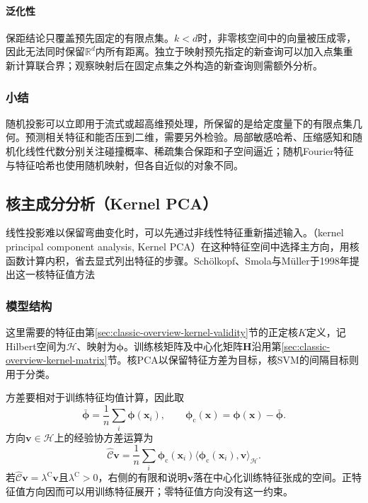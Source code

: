 \paragraph{泛化性}

保距结论只覆盖预先固定的有限点集。$k<d$时，非零核空间中的向量被压成零，因此无法同时保留$\mathbb{R}^{d}$内所有距离。独立于映射预先指定的新查询可以加入点集重新计算联合界；观察映射后在固定点集之外构造的新查询则需额外分析。

\subsubsection{小结}
\label{sec:dim-rp-summary}

随机投影可以立即用于流式或超高维预处理，所保留的是给定度量下的有限点集几何。预测相关特征和能否压到二维，需要另外检验。局部敏感哈希、压缩感知和随机化线性代数分别关注碰撞概率、稀疏集合保距和子空间逼近；随机Fourier特征与特征哈希也使用随机映射，但各自近似的对象不同。

\subsection{核主成分分析（Kernel PCA）}
\label{sec:dim-kpca}

线性投影难以保留弯曲变化时，可以先通过非线性特征重新描述输入。（kernel principal component analysis, Kernel PCA）在这种特征空间中选择主方向，用核函数计算内积，省去显式列出特征的步骤。Schölkopf、Smola与Müller于1998年提出这一核特征值方法

\subsubsection{模型结构}

这里需要的特征由第\ref{sec:classic-overview-kernel-validity}节的正定核$K$定义，记Hilbert空间为$\mathcal{H}$、映射为$\bm{\phi}$。训练核矩阵及中心化矩阵$\bm{H}$沿用第\ref{sec:classic-overview-kernel-matrix}节。核PCA以保留特征方差为目标，核SVM的间隔目标则用于分类。

方差要相对于训练特征均值计算，因此取
\[
  \bar{\bm{\phi}}=\frac1n\sum_i\bm{\phi}(\bm{x}_i),
  \qquad
  \bm{\phi}_{\mathrm{c}}(\bm{x})=\bm{\phi}(\bm{x})-\bar{\bm{\phi}}.
\]
方向$\bm{v}\in\mathcal{H}$上的经验协方差运算为
\begin{equation}
  \label{eq:dim-kpca-covariance}
  \widehat{\mathcal{C}}\bm{v}
  =\frac1n\sum_i
    \bm{\phi}_{\mathrm{c}}(\bm{x}_i)
    \langle\bm{\phi}_{\mathrm{c}}(\bm{x}_i),\bm{v}\rangle_{\mathcal{H}}.
\end{equation}
若$\widehat{\mathcal{C}}\bm{v}=\lambda^{\mathrm{C}}\bm{v}$且$\lambda^{\mathrm{C}}>0$，右侧的有限和说明$\bm{v}$落在中心化训练特征张成的空间。正特征值方向因而可以用训练特征展开；零特征值方向没有这一约束。

